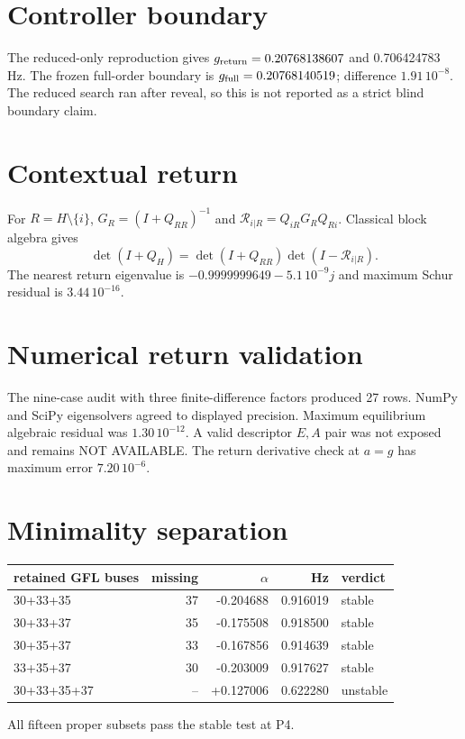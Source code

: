 \documentclass[10pt]{article}
\begin{document}
\section{Controller boundary}
The reduced-only reproduction gives $g_{\rm return}=0.20768138607$ and
0.706424783 Hz. The frozen full-order boundary is
$g_{\rm full}=0.20768140519$; difference $1.91\,10^{-8}$. The reduced search
ran after reveal, so this is not reported as a strict blind boundary claim.

\section{Contextual return}
For $R=H\setminus\{i\}$,
$G_R=(I+Q_{RR})^{-1}$ and
$\mathcal R_{i|R}=Q_{iR}G_RQ_{Ri}$. Classical block algebra gives
\[
\det(I+Q_H)=\det(I+Q_{RR})\det(I-\mathcal R_{i|R}).
\]
The nearest return eigenvalue is $-0.9999999649-5.1\,10^{-9}j$ and maximum
Schur residual is $3.44\,10^{-16}$.
\section{Numerical return validation}
The nine-case audit with three finite-difference factors produced 27 rows.
NumPy and SciPy eigensolvers agreed to displayed precision. Maximum
equilibrium algebraic residual was $1.30\,10^{-12}$. A valid descriptor
$E,A$ pair was not exposed and remains NOT AVAILABLE. The return derivative
check at $a=g$ has maximum error $7.20\,10^{-6}$.

\section{Minimality separation}
\begin{center}
\begin{tabular}{lrrrl}
\toprule
retained GFL buses & missing & $\alpha$ & Hz & verdict\\
\midrule
30+33+35 & 37 & -0.204688 & 0.916019 & stable\\
30+33+37 & 35 & -0.175508 & 0.918500 & stable\\
30+35+37 & 33 & -0.167856 & 0.914639 & stable\\
33+35+37 & 30 & -0.203009 & 0.917627 & stable\\
30+33+35+37 & -- & +0.127006 & 0.622280 & unstable\\
\bottomrule
\end{tabular}
\end{center}
All fifteen proper subsets pass the stable test at P4.
\end{document}
